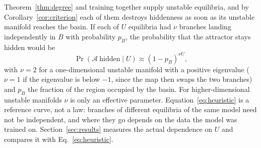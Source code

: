 Theorem~\ref{thm:degree} and training together supply unstable equilibria, and by Corollary~\ref{cor:criterion} each of them
destroys hiddenness as soon as its unstable manifold reaches the basin. If each of $U$ equilibria had $\nu$ branches
landing independently in $B$ with probability $p_B$, the probability that the attractor stays hidden would be
\begin{equation}
\Pr(\mathcal{A}\ \text{hidden}\mid U)\approx(1-p_B)^{\nu U},
\label{eq:heuristic}
\end{equation}
with $\nu=2$ for a one-dimensional unstable manifold with a positive eigenvalue ($\nu=1$ if the eigenvalue is below $-1$,
since the map then swaps the two branches) and $p_B$ the fraction of the region occupied by the basin. For
higher-dimensional unstable manifolds $\nu$ is only an effective parameter. Equation~\eqref{eq:heuristic} is a reference curve, not a law:
branches of different equilibria of the same model need not be independent, and where they go depends on the data the
model was trained on. Section~\ref{sec:results} measures the actual dependence on $U$ and compares it with
Eq.~\eqref{eq:heuristic}.
